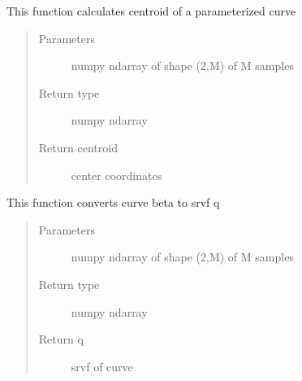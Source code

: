 \documentclass[letterpaper,10pt,english]{sphinxmanual}
\begin{document}

\begin{fulllineitems}
\label{\detokenize{curve_functions:curve_functions.calculatecentroid}}
This function calculates centroid of a parameterized curve
\begin{quote}\begin{description}
\item[{Parameters}] \leavevmode
{} \textendash{} numpy ndarray of shape (2,M) of M samples

\item[{Return type}] \leavevmode
numpy ndarray

\item[{Return centroid}] \leavevmode
center coordinates

\end{description}\end{quote}

\end{fulllineitems}


\begin{fulllineitems}
\label{\detokenize{curve_functions:curve_functions.curve_to_q}}
This function converts curve beta to srvf q
\begin{quote}\begin{description}
\item[{Parameters}] \leavevmode
{} \textendash{} numpy ndarray of shape (2,M) of M samples

\item[{Return type}] \leavevmode
numpy ndarray

\item[{Return q}] \leavevmode
srvf of curve

\end{description}\end{quote}

\end{fulllineitems}
\end{document}
